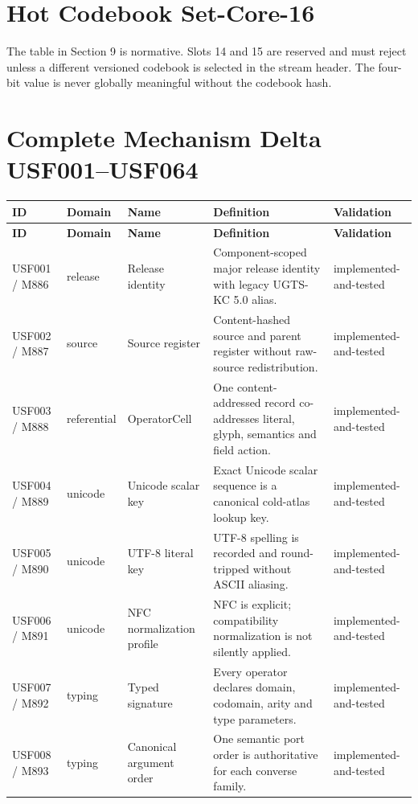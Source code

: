 \documentclass[11pt,a4paper]{article}
\begin{document}
\section{Hot Codebook Set-Core-16}
The table in Section 9 is normative. Slots 14 and 15 are reserved and must reject unless a different versioned codebook is selected in the stream header. The four-bit value is never globally meaningful without the codebook hash.

\section{Complete Mechanism Delta USF001--USF064}
\scriptsize
{}
\begin{longtable}{P{20mm}P{15mm}P{28mm}P{70mm}P{20mm}}
\toprule
\textbf{ID} & \textbf{Domain} & \textbf{Name} & \textbf{Definition} & \textbf{Validation}\\
\midrule
\endfirsthead
\toprule
\textbf{ID} & \textbf{Domain} & \textbf{Name} & \textbf{Definition} & \textbf{Validation}\\
\midrule
\endhead
\bottomrule
\endlastfoot
USF001 / M886 & release & Release identity & Component-scoped major release identity with legacy UGTS-KC 5.0 alias. & implemented-and-tested \\
USF002 / M887 & source & Source register & Content-hashed source and parent register without raw-source redistribution. & implemented-and-tested \\
USF003 / M888 & referential & OperatorCell & One content-addressed record co-addresses literal, glyph, semantics and field action. & implemented-and-tested \\
USF004 / M889 & unicode & Unicode scalar key & Exact Unicode scalar sequence is a canonical cold-atlas lookup key. & implemented-and-tested \\
USF005 / M890 & unicode & UTF-8 literal key & UTF-8 spelling is recorded and round-tripped without ASCII aliasing. & implemented-and-tested \\
USF006 / M891 & unicode & NFC normalization profile & NFC is explicit; compatibility normalization is not silently applied. & implemented-and-tested \\
USF007 / M892 & typing & Typed signature & Every operator declares domain, codomain, arity and type parameters. & implemented-and-tested \\
USF008 / M893 & typing & Canonical argument order & One semantic port order is authoritative for each converse family. & implemented-and-tested \\

\end{longtable}
\end{document}
